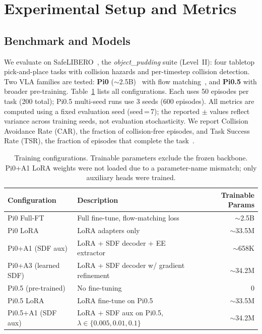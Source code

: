 \section{Experimental Setup and Metrics}\label{sec:method}

\subsection{Benchmark and Models}\label{sec:benchmark}

We evaluate on SafeLIBERO~\cite{hu2025vlsa}, the \textit{object\_pudding} suite (Level~II): four tabletop pick-and-place tasks with collision hazards and per-timestep collision detection. Two VLA families are tested: \textbf{Pi0} (${\sim}$2.5B)~\cite{black2024pi0} with flow matching~\cite{lipman2023flow}, and \textbf{Pi0.5} with broader pre-training. Table~\ref{tab:configurations} lists all configurations. Each uses 50 episodes per task (200 total); Pi0.5 multi-seed runs use 3 seeds (600 episodes). All metrics are computed using a fixed evaluation seed (seed\,=\,7); the reported $\pm$ values reflect variance across training seeds, not evaluation stochasticity. We report Collision Avoidance Rate (CAR), the fraction of collision-free episodes, and Task Success Rate (TSR), the fraction of episodes that complete the task~\cite{hu2025vlsa,zhang2025safevla}.

\begin{table}[t]
\centering
\caption{Training configurations. Trainable parameters exclude the frozen backbone. Pi0+A1 LoRA weights were not loaded due to a parameter-name mismatch; only auxiliary heads were trained.}
\label{tab:configurations}
\vspace{2pt}
\small
\begin{tabular}{llr}
\toprule
Configuration & Description & Trainable Params \\
\midrule
Pi0 Full-FT & Full fine-tune, flow-matching loss & ${\sim}$2.5B \\
Pi0 LoRA & LoRA adapters only & ${\sim}$33.5M \\
Pi0+A1 (SDF aux) & LoRA + SDF decoder + EE extractor & ${\sim}$658K \\
Pi0+A3 (learned SDF) & LoRA + SDF decoder w/ gradient refinement & ${\sim}$34.2M \\
Pi0.5 (pre-trained) & No fine-tuning & 0 \\
Pi0.5 LoRA & LoRA fine-tune on Pi0.5 & ${\sim}$33.5M \\
Pi0.5+A1 (SDF aux) & LoRA + SDF aux on Pi0.5, $\lambda \in \{0.005, 0.01, 0.1\}$ & ${\sim}$34.2M \\
\bottomrule
\end{tabular}
\end{table}

